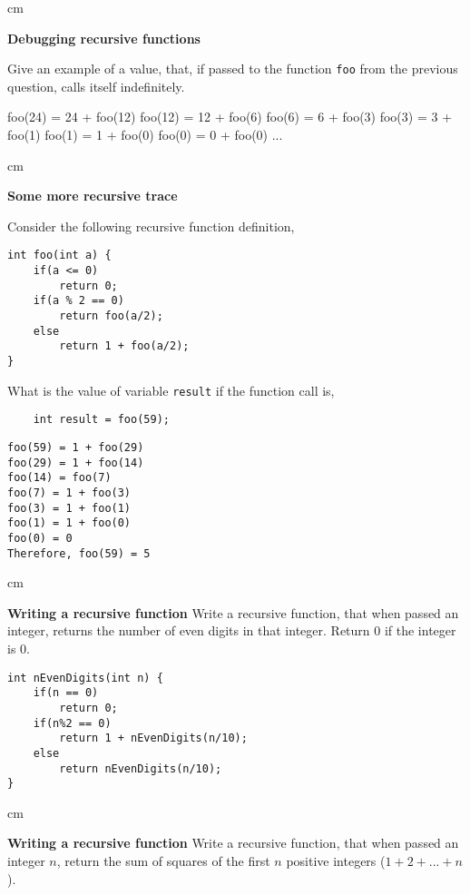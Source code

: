 \begin{questions}
 cm 

\question  \textbf{Debugging recursive functions} \vskip 0.5cm

Give an example of a value, that, if passed to the function \texttt{foo} from the previous question, calls itself indefinitely.

\begin{solution}
foo(24) = 24 + foo(12)
foo(12) = 12 + foo(6)
foo(6) = 6 + foo(3)
foo(3) = 3 + foo(1)
foo(1) = 1 + foo(0)
foo(0) = 0 + foo(0)
...	
\end{solution}

 cm

\question  \textbf{Some more recursive trace} \vskip 0.5cm

Consider the following recursive function definition,

\begin{lstlisting}
int foo(int a) {
	if(a <= 0)
		return 0;
	if(a % 2 == 0)
		return foo(a/2);
	else
		return 1 + foo(a/2);
}
\end{lstlisting}

What is the value of variable \texttt{result} if the function call is,

\begin{lstlisting}
	int result = foo(59);
\end{lstlisting}

\begin{solution}
\begin{verbatim}
foo(59) = 1 + foo(29)
foo(29) = 1 + foo(14)
foo(14) = foo(7)
foo(7) = 1 + foo(3)
foo(3) = 1 + foo(1)
foo(1) = 1 + foo(0)
foo(0) = 0
Therefore, foo(59) = 5
\end{verbatim}
\end{solution}

 cm

\question  \textbf{Writing a recursive function} \vskip 0.5cm
Write a recursive function, that when passed an integer, returns the number of even digits in that integer. Return 0 if the integer is 0.

\begin{solution}
\begin{lstlisting}
int nEvenDigits(int n) {
	if(n == 0)
		return 0;
	if(n%2 == 0)
		return 1 + nEvenDigits(n/10);
	else
		return nEvenDigits(n/10);
}
\end{lstlisting}	
\end{solution}

 cm

\question  \textbf{Writing a recursive function} \vskip 0.5cm
Write a recursive function, that when passed an integer $n$, return the sum of squares of the first $n$ positive integers  ($1 + 2 + ... + n$).


\end{questions}

